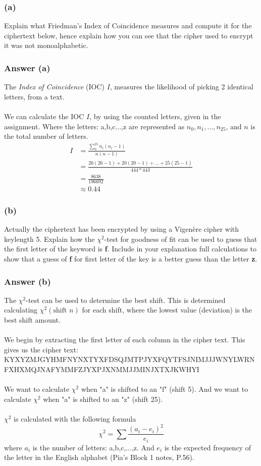 \documentclass{article}
\begin{document}
	\subsubsection*{(a)}
	Explain what Friedman’s Index of Coincidence measures and compute it for the
	ciphertext below, hence explain how you can see that the cipher used to encrypt
	it was not monoalphabetic.
	
	\subsubsection*{Answer (a)}
	The \textit{Index of Coincidence} (IOC) $I$, measures the likelihood of picking 2 identical letters, from a text. 
	\\\\
	We can calculate the IOC $I$, by using the counted letters, given in the assignment. Where the  letters: a,b,c...,z are represented as $n_0,n_1,...,n_{25}$, and $n$ is the total number of letters. 
	\[
	\begin{split}
	I &= \frac{\sum_{0}^{25}n_i(n_i-1)}{n(n-1)} \\
	&=\frac{26(26-1)+20(20-1)+...+25(25-1)}{444*443} \\
	&=\frac{8638}{196692} \\
	&\approx0.44
	\end{split}
	\]
	
	\subsubsection*{(b)}
	Actually the ciphertext has been encrypted by using a Vigenère cipher with
	keylength 5. Explain how the $\chi^2$-test for goodness of fit can be used to guess that
	the first letter of the keyword is \textbf{f}. Include in your explanation full calculations to
	show that a guess of \textbf{f} for first letter of the key is a better guess than the letter \textbf{z}.
	
	\subsubsection*{Answer (b)}
	The $\chi^2$-test can be used to determine the best shift. This is determined calculating $\chi^2(\text{shift } n)$ for each shift, where the lowest value (deviation) is the best shift amount.  
	\\\\
	We begin by extracting the first letter of each column in the cipher text. This gives us the cipher text: 
	KYXYZMJGYHMFNYNXTYXFDSQJMTPJYXFQYTFSJNIMJJJWNYLWRNFXHXMQJNAFYMMFZJYXPJXNMMJJMINJXTXJKWHYI
	\\\\
	We want to calculate $\chi^2$ when "a" is shifted to an "f" (shift 5). And we want to calculate $\chi^2$ when "a" is shifted to an "z" (shift 25). 
	\\\\
	$\chi^2$ is calculated with the following formula
	$$
	\chi^2=\sum\frac{(a_i-e_i)^2}{e_i}
	$$
	where $a_i$ is the number of letters: a,b,c,...,z. And $e_i$ is the expected frequency of the letter in the English alphabet (Pia's Block 1 notes, P.56).
\end{document}
